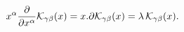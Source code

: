\begin{equation}
x^{\alpha}\frac{\partial }{\partial x^{\alpha}}{\cal
K}_{\gamma\beta}(x)= x.\partial {\cal
K}_{\gamma\beta}(x)=\lambda\, {\cal K}_{\gamma\beta}(x).
\end{equation}

